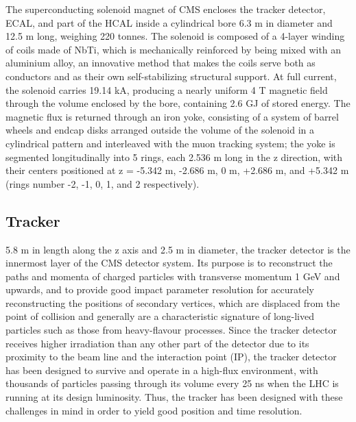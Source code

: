 The superconducting solenoid magnet of CMS encloses the tracker detector, ECAL, and part of the HCAL inside a cylindrical bore 6.3 m in diameter and 12.5 m long, weighing 220 tonnes. The solenoid is composed of a 4-layer winding of coils made of NbTi, which is mechanically reinforced by being mixed with an aluminium alloy, an innovative method that makes the coils serve both as conductors and as their own self-stabilizing structural support. At full current, the solenoid carries 19.14 kA, producing a nearly uniform 4 T magnetic field through the volume enclosed by the bore, containing 2.6 GJ of stored energy. The magnetic flux is returned through an iron yoke, consisting of a system of barrel wheels and endcap disks arranged outside the volume of the solenoid in a cylindrical pattern and interleaved with the muon tracking system; the yoke is segmented longitudinally into 5 rings, each 2.536 m long in the z direction, with their centers positioned at z = -5.342 m, -2.686 m, 0 m, +2.686 m, and +5.342 m (rings number -2, -1, 0, 1, and 2 respectively).

\subsection{Tracker\label{sec:cms-tracker}}

5.8 m in length along the z axis and 2.5 m in diameter, the tracker detector is the innermost layer of the CMS detector system. Its purpose is to reconstruct the paths and momenta of charged particles with transverse momentum 1 GeV and upwards, and to provide good impact parameter resolution for accurately reconstructing the positions of secondary vertices, which are displaced from the point of collision and generally are a characteristic signature of long-lived particles such as those from heavy-flavour processes. Since the tracker detector receives higher irradiation than any other part of the detector due to its proximity to the beam line and the interaction point (IP), the tracker detector has been designed to survive and operate in a high-flux environment, with thousands of particles passing through its volume every 25 ns when the LHC is running at its design luminosity. Thus, the tracker has been designed with these challenges in mind in order to yield good position and time resolution.

